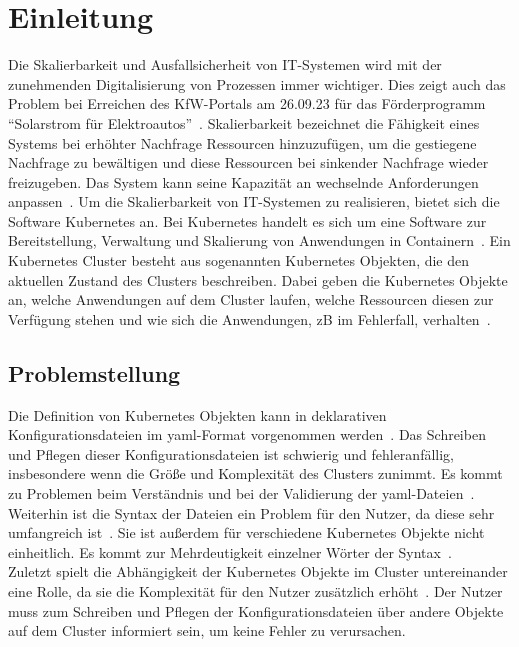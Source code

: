 \chapter{Einleitung}\label{ch:introduction}

Die Skalierbarkeit und Ausfallsicherheit von IT-Systemen wird mit der zunehmenden Digitalisierung von Prozessen immer wichtiger.
Dies zeigt auch das Problem bei Erreichen des KfW-Portals am 26.09.23 für das Förderprogramm ``Solarstrom für Elektroautos''~\cite{kfw-not-reachable}.
Skalierbarkeit bezeichnet die Fähigkeit eines Systems bei erhöhter Nachfrage Ressourcen hinzuzufügen, um die gestiegene Nachfrage zu bewältigen und
diese Ressourcen bei sinkender Nachfrage wieder freizugeben. Das System kann seine Kapazität an wechselnde Anforderungen anpassen~\cite{it-system-scaling}.
Um die Skalierbarkeit von IT-Systemen zu realisieren, bietet sich die Software Kubernetes an.
Bei Kubernetes handelt es sich um eine Software zur Bereitstellung, Verwaltung und Skalierung von Anwendungen in Containern~\cite{kubernetes-overview}.
Ein Kubernetes Cluster besteht aus sogenannten Kubernetes Objekten, die den aktuellen Zustand des Clusters beschreiben. Dabei geben die Kubernetes Objekte an,
welche Anwendungen auf dem Cluster laufen, welche Ressourcen diesen zur Verfügung stehen und wie sich die Anwendungen, \acs{zB} im Fehlerfall, verhalten~\cite{kubernetes-objects}.

\section{Problemstellung}\label{sec:problem}

Die Definition von Kubernetes Objekten kann in deklarativen Konfigurationsdateien im \ac{yaml}-Format vorgenommen werden~\cite{kubernetes-config-declarative}.
Das Schreiben und Pflegen dieser Konfigurationsdateien ist schwierig und fehleranfällig, 
insbesondere wenn die Größe und Komplexität des Clusters zunimmt.
Es kommt zu Problemen beim Verständnis und bei der Validierung der \ac{yaml}-Dateien~\cite{dev-to-kubernetes-challenges,kubetools-io-kubernetes-manifest-management}. 
\\
Weiterhin ist die Syntax der Dateien ein Problem für den Nutzer, da diese sehr umfangreich ist~\cite{entwickler-de-kubernetes-problems}.
Sie ist außerdem für verschiedene Kubernetes Objekte nicht einheitlich. 
Es kommt zur Mehrdeutigkeit einzelner Wörter der Syntax~\cite{dev-to-kubernetes-challenges}.
\\
Zuletzt spielt die Abhängigkeit der Kubernetes Objekte im Cluster untereinander eine Rolle, 
da sie die Komplexität für den Nutzer zusätzlich erhöht~\cite{spacelift-io-kubernetes-challenges,newstack-io-kubernetes-manifest-lifecycle}.
Der Nutzer muss zum Schreiben und Pflegen der Konfigurationsdateien über andere Objekte auf dem Cluster informiert sein, um 
keine Fehler zu verursachen.

